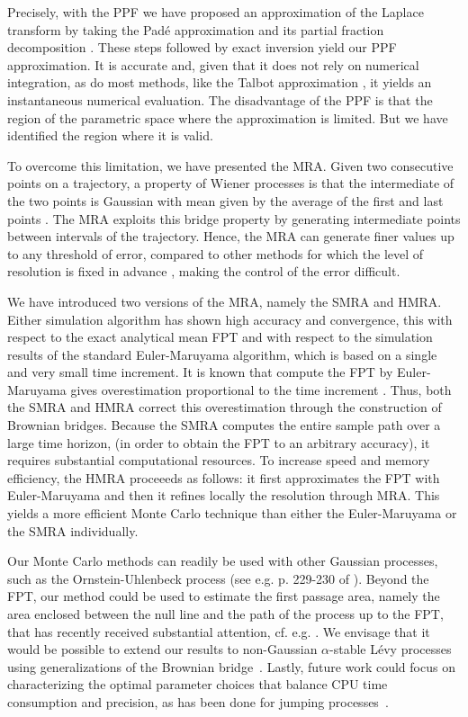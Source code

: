 \documentclass[preprint,12pt]{elsarticle}
\numberwithin{equation}{section}
\theoremstyle{plain} \newtheorem{theorem}{Theorem}[section]
\theoremstyle{plain} \newtheorem{proposition}[theorem]{Proposition}
\theoremstyle{plain} \newtheorem{lemma}[theorem]{Lemma}
\theoremstyle{plain} \newtheorem{corollary}[theorem]{Corollary}
\theoremstyle{definition} \newtheorem{definition}[theorem]{Definition}
\theoremstyle{definition} \newtheorem{notation}[theorem]{Notation}
\theoremstyle{remark} \newtheorem{remark}[theorem]{Remark}
\theoremstyle{remark} \newtheorem{remarks}[theorem]{Remarks}
\theoremstyle{remark} \newtheorem{algorithm2}[theorem]{Algorithm}
\theoremstyle{remark} \newtheorem{example}[theorem]{Example}
\begin{document}
Precisely, with the PPF we have proposed an approximation of the Laplace transform by taking the Pad{\'e} approximation and its partial fraction decomposition \cite{Davies1979}. These steps followed by exact inversion yield our PPF approximation.
It is accurate and, given that it does not rely on numerical integration, as do most methods, like the Talbot approximation \cite{talbot1979accurate, abateUnifiedFrameworkNumerically2006}, it yields an instantaneous numerical evaluation. 
The disadvantage of the PPF is that the region of the parametric space where the approximation is limited. But we have identified the region where it is valid.

To overcome this limitation, we have presented the MRA. Given two consecutive points on a trajectory, a property of Wiener processes is that the intermediate of the two points is Gaussian with mean given by the average of the first and last points \cite{Lawler_Gregory_F_1995-07-01}. The MRA exploits this bridge property by generating intermediate points between intervals of the trajectory. Hence, the MRA can generate finer values up to any threshold of error, compared to other methods for which the level of resolution is fixed in advance \cite{asmussen2007stochastic}, making the control of the error difficult.

We have introduced two versions of the MRA, namely the SMRA and HMRA. Either simulation algorithm has shown high accuracy and convergence,
this with respect to the exact analytical mean FPT and 
with respect 
to the simulation results of the standard Euler-Maruyama algorithm,
which is based on a single and very small time increment. 
It is known that compute the FPT
by Euler-Maruyama gives overestimation proportional to the time increment \cite{asmussen2007stochastic}. Thus, both the SMRA and HMRA correct this overestimation through the construction of Brownian bridges. 
Because
the SMRA computes the entire sample path over a large time horizon, 
(in order to obtain the FPT to an arbitrary accuracy), it requires substantial computational resources. To increase speed and memory efficiency, the HMRA proceeeds as follows: it first approximates the FPT with Euler-Maruyama and then it refines locally the resolution through MRA.
This yields a more efficient Monte Carlo technique than either the Euler-Maruyama or the SMRA individually.

Our Monte Carlo methods can readily be used with other Gaussian processes, such as the Ornstein-Uhlenbeck process
(see e.g. p. 229-230 of \cite{gatto2022stationary,dubey2023first}).
Beyond the FPT, our method could be used to estimate 
the first passage area, namely
the area enclosed between the null line and the path of the process up to the FPT, that has recently received substantial
attention, cf. e.g. \cite{abundo2023first}. 
We envisage that it would be possible to extend our results to non-Gaussian $\alpha$-stable L\'evy processes using generalizations of the Brownian bridge~\cite{Majumdar_2015_effective,Aguilar_PRE,Aguilar_Gatto_PRE}. Lastly, future work could focus on characterizing the optimal parameter choices that balance CPU time consumption and precision, as has been done for jumping processes~\cite{aguilar2024biased}.
\end{document}
